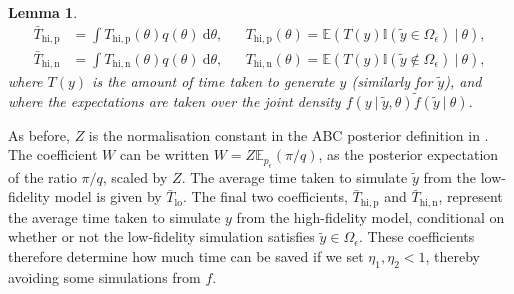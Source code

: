 \documentclass[12pt, onecolumn]{article}
\newtheorem{lemma}[theorem]{Lemma}
\begin{document}
\begin{lemma}
\begin{subequations}
\begin{align}
\bar T_{\mathrm{hi,p}} &= \int T_{\mathrm{hi,p}}(\theta) q(\theta) ~\mathrm d\theta
,&
&T_{\mathrm{hi,p}}(\theta) = \mathbb E\left( T(y) \mathbb I(\tilde y \in \Omega_\epsilon) ~|~ \theta \right)
,\\
\bar T_{\mathrm{hi,n}} &= \int T_{\mathrm{hi,n}}(\theta) q(\theta) ~\mathrm d\theta
,&
&T_{\mathrm{hi,n}}(\theta) = \mathbb E\left( T(y) \mathbb I(\tilde y \notin \Omega_\epsilon) ~|~ \theta \right)
,
\end{align}
\end{subequations}
where $T(y)$ is the amount of time taken to generate $y$ (similarly for $\tilde y$), and where the expectations are taken over the joint density $f(y~|~\tilde y, \theta) \tilde f(\tilde y~|~\theta)$.
\end{lemma}

As before, $Z$ is the normalisation constant in the ABC posterior definition in .
The coefficient $W$ can be written $W = Z \mathbb E_{p_\epsilon}(\pi/q)$, as the posterior expectation of the ratio $\pi / q$, scaled by $Z$.
The average time taken to simulate $\tilde y$ from the low-fidelity model is given by $\bar T_{\mathrm{lo}}$.
The final two coefficients, $\bar T_{\mathrm{hi,p}}$ and $\bar T_{\mathrm{hi,n}}$, represent the average time taken to simulate $y$ from the high-fidelity model, conditional on whether or not the low-fidelity simulation satisfies $\tilde y \in \Omega_\epsilon$.
These coefficients therefore determine how much time can be saved if we set $\eta_1,\eta_2 < 1$, thereby avoiding some simulations from $f$.
\end{document}

